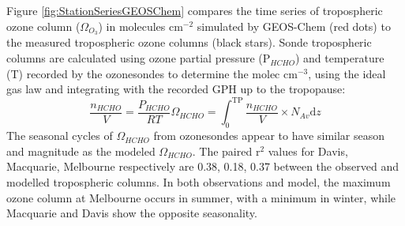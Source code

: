 \documentclass{article}
\begin{document}
  Figure \ref{fig:StationSeriesGEOSChem} compares the time series of tropospheric ozone column ($\Omega_{O_3}$) in molecules cm$^{-2}$ simulated by GEOS-Chem (red dots) to the measured tropospheric ozone columns (black stars).
  Sonde tropospheric columns are calculated using ozone partial pressure (P$_{HCHO}$) and temperature (T) recorded by the ozonesondes to determine the molec cm$^{-3}$, using the ideal gas law and integrating with the recorded GPH up to the tropopause:
  \begin{equation*}
    \frac{n_{HCHO}}{V} = \frac{P_{HCHO}}{RT}
    \Omega_{HCHO} = \int_{0}^{\text{TP}} \frac{n_{HCHO}}{V} \times N_{Av} \text{d}z
  \end{equation*}
  The seasonal cycles of $\Omega_{HCHO}$ from ozonesondes appear to have similar season and magnitude as the modeled $\Omega_{HCHO}$.
  The paired r$^2$ values for Davis, Macquarie, Melbourne respectively are 0.38, 0.18, 0.37 between the observed and modelled tropospheric columns.
  In both observations and model, the maximum ozone column at Melbourne occurs in summer, with a minimum in winter, while Macquarie and Davis show the opposite seasonality.
  
\end{document}
